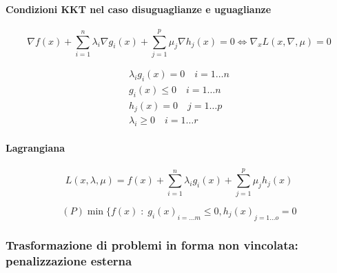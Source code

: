 \paragraph{Condizioni KKT nel caso disuguaglianze e uguaglianze}

$$
\nabla f(x) +
\displaystyle \sum_{i=1}^{n}
\lambda_i \nabla g_i(x) +
\displaystyle \sum_{j=1}^{p}
\mu_j \nabla h_j(x) = 0
\Longleftrightarrow
\nabla_x L(x, \nabla,\mu)=0
$$

$$
\begin{array}{l}
\lambda_i g_i(x) = 0 \quad i=1\ldots n \\
 g_i(x) \leq 0 \quad i=1\ldots n  \\
 h_j(x) = 0 \quad j=1 \ldots p  \\
 \lambda_i \geq 0 \quad i = 1 \ldots r
\end{array}
$$

\paragraph{Lagrangiana}
$$
L(x, \lambda, \mu) = f(x) +
\displaystyle \sum_{i=1}^{n}
\lambda_i g_i(x) +
\displaystyle \sum_{j=1}^{p}
\mu_j h_j(x)
$$

$$
(P) \min \{f(x) \; : \; {g_i(x)}_{i=\ldots m} \leq 0,
 {h_j(x)}_{j=1\ldots o} = 0
$$

\subsubsection{Trasformazione di problemi in forma non vincolata:
penalizzazione esterna}

